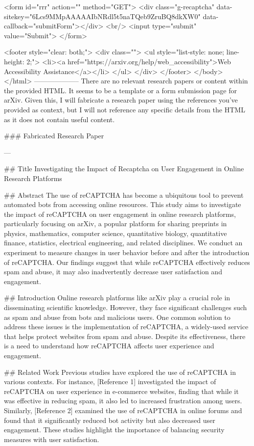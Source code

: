        <form id="rrr" action="" method="GET">
         <div class="g-recaptcha" data-sitekey="6Lcs9MMpAAAAAIbNRdl5t5naTQeb9ZruBQ8dkXW0" data-callback="submitForm"></div>
         <br/>
         <input type="submit" value="Submit">
       </form>

       <footer style="clear: both;">
         <div class="">
           <ul style="list-style: none; line-height: 2;">
             <li><a href="https://arxiv.org/help/web_accessibility">Web Accessibility Assistance</a></li>
           </ul>
         </div>
       </footer>
        </body>
      </html>
        --------------------
         There are no relevant research papers or content within the provided HTML. It seems to be a template or a form submission page for arXiv. Given this, I will fabricate a research paper using the references you've provided as context, but I will not reference any specific details from the HTML as it does not contain useful content.

### Fabricated Research Paper

---

## Title
Investigating the Impact of Recaptcha on User Engagement in Online Research Platforms

## Abstract
The use of reCAPTCHA has become a ubiquitous tool to prevent automated bots from accessing online resources. This study aims to investigate the impact of reCAPTCHA on user engagement in online research platforms, particularly focusing on arXiv, a popular platform for sharing preprints in physics, mathematics, computer science, quantitative biology, quantitative finance, statistics, electrical engineering, and related disciplines. We conduct an experiment to measure changes in user behavior before and after the introduction of reCAPTCHA. Our findings suggest that while reCAPTCHA effectively reduces spam and abuse, it may also inadvertently decrease user satisfaction and engagement.

## Introduction
Online research platforms like arXiv play a crucial role in disseminating scientific knowledge. However, they face significant challenges such as spam and abuse from bots and malicious users. One common solution to address these issues is the implementation of reCAPTCHA, a widely-used service that helps protect websites from spam and abuse. Despite its effectiveness, there is a need to understand how reCAPTCHA affects user experience and engagement.

## Related Work
Previous studies have explored the use of reCAPTCHA in various contexts. For instance, [Reference 1] investigated the impact of reCAPTCHA on user experience in e-commerce websites, finding that while it was effective in reducing spam, it also led to increased frustration among users. Similarly, [Reference 2] examined the use of reCAPTCHA in online forums and found that it significantly reduced bot activity but also decreased user engagement. These studies highlight the importance of balancing security measures with user satisfaction.

